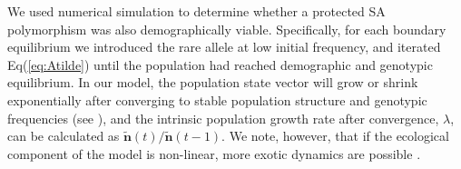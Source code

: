 \documentclass[11pt]{article}
\def\mbf#1{\mathbf{#1}}
\begin{document}



We used numerical simulation to determine whether a protected SA polymorphism was also demographically viable. Specifically, for each boundary equilibrium we introduced the rare allele at low initial frequency, and iterated Eq(\ref{eq:Atilde}) until the population had reached demographic and genotypic equilibrium. In our model, the population state vector will grow or shrink exponentially after converging to stable population structure and genotypic frequencies (see \citealt{Caswell2001}), and the intrinsic population growth rate after convergence, $\lambda$, can be calculated as $\tilde{\mbf{n}}(t)/\tilde{\mbf{n}}(t-1)$. We note, however, that if the ecological component of the model is non-linear, more exotic dynamics are possible \citep{de2020matrix}.
\end{document}
